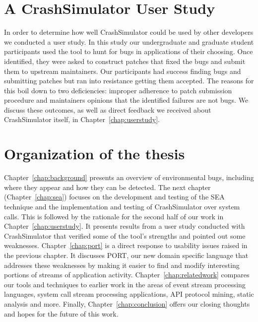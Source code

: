 \section{A CrashSimulator User Study}
In order to determine how well CrashSimulator could be used by other developers we conducted a user study.
In this study our undergraduate and graduate student participants used the tool to hunt for bugs in applications of their choosing.
Once identified, they were asked to construct patches that fixed the bugs and submit them to upstream maintainers.
Our participants had success finding bugs and submitting patches but ran into resistance getting them accepted.
The reasons for this boil down to two deficiencies:
improper adherence to patch submission procedure and maintainers opinions that the identified failures are not bugs.
We discuss these outcomes, as well as direct feedback we received about CrashSimulator itself, in Chapter~\ref{chap:userstudy}.


\section{Organization of the thesis}
\label{sec:organization}
Chapter~\ref{chap:background}
presents an overview of environmental bugs, including where they
appear and how they can be detected.
The next chapter (Chapter~\ref{chap:sea}) focuses on the development and testing of the SEA technique and the implementation and testing of CrashSimulator over system calls.
This is followed by the rationale for the second half of our work in  Chapter~\ref{chap:userstudy}. It presents results
from a user study conducted with CrashSimulator that
verified some of the tool's strengths and pointed out some weaknesses.
Chapter~\ref{chap:port}
is a direct response to usability issues raised in the previous chapter. It  discusses PORT,
our new domain specific language that addresses these weaknesses by making
it easier to find and modify interesting portions of streams of
application activity.
Chapter~\ref{chap:relatedwork}
compares our tools and techniques to earlier work in the areas of event stream processing languages, system call stream processing applications, API protocol mining, static analysis and more.
Finally,
Chapter~\ref{chap:conclusion} offers our closing thoughts and hopes for
the future of this work.
